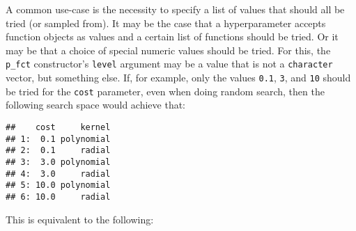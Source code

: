 \documentclass[
]{scrbook}
\newenvironment{Shaded}{\begin{snugshade}}{\end{snugshade}}
\newcommand{\AttributeTok}[1]{\textcolor[rgb]{0.77,0.63,0.00}{#1}}
\newcommand{\ControlFlowTok}[1]{\textcolor[rgb]{0.13,0.29,0.53}{\textbf{#1}}}
\newcommand{\DecValTok}[1]{\textcolor[rgb]{0.00,0.00,0.81}{#1}}
\newcommand{\FloatTok}[1]{\textcolor[rgb]{0.00,0.00,0.81}{#1}}
\newcommand{\FunctionTok}[1]{\textcolor[rgb]{0.00,0.00,0.00}{#1}}
\newcommand{\NormalTok}[1]{#1}
\newcommand{\OtherTok}[1]{\textcolor[rgb]{0.56,0.35,0.01}{#1}}
\newcommand{\SpecialCharTok}[1]{\textcolor[rgb]{0.00,0.00,0.00}{#1}}
\newcommand{\StringTok}[1]{\textcolor[rgb]{0.31,0.60,0.02}{#1}}
\renewenvironment{Shaded} {\begin{snugshade}\small} {\end{snugshade}}
\begin{document}
A common use-case is the necessity to specify a list of values that should all be tried (or sampled from).
It may be the case that a hyperparameter accepts function objects as values and a certain list of functions should be tried.
Or it may be that a choice of special numeric values should be tried.
For this, the \texttt{p\_fct} constructor's \texttt{level} argument may be a value that is not a \texttt{character} vector, but something else.
If, for example, only the values \texttt{0.1}, \texttt{3}, and \texttt{10} should be tried for the \texttt{cost} parameter, even when doing random search, then the following search space would achieve that:

\begin{Shaded}
\end{Shaded}

\begin{verbatim}
##    cost     kernel
## 1:  0.1 polynomial
## 2:  0.1     radial
## 3:  3.0 polynomial
## 4:  3.0     radial
## 5: 10.0 polynomial
## 6: 10.0     radial
\end{verbatim}

This is equivalent to the following:

\begin{Shaded}
\end{Shaded}
\end{document}
